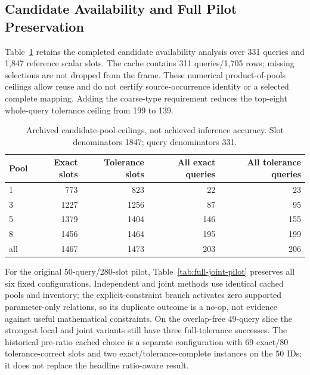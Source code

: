 \subsection{Candidate Availability and Full Pilot Preservation}
Table~\ref{tab:cached-ceilings} retains the completed candidate availability analysis over 331 queries and 1,847 reference scalar slots. The cache contains 311 queries/1,705 rows; missing selections are not dropped from the frame. These numerical product-of-pools ceilings allow reuse and do not certify source-occurrence identity or a selected complete mapping. Adding the coarse-type requirement reduces the top-eight whole-query tolerance ceiling from 199 to 139.

\begin{table}[htbp]\centering\small
\caption{Archived candidate-pool ceilings, not achieved inference accuracy. Slot denominators 1847; query denominators 331.}\label{tab:cached-ceilings}
\begin{tabular}{@{}lrrrr@{}}\toprule
Pool & Exact slots & Tolerance slots & All exact queries & All tolerance queries\\\midrule
1 & 773 & 823 & 22 & 23\\
3 & 1227 & 1256 & 87 & 95\\
5 & 1379 & 1404 & 146 & 155\\
8 & 1456 & 1464 & 195 & 199\\
all & 1467 & 1473 & 203 & 206\\
\bottomrule\end{tabular}\end{table}

For the original 50-query/280-slot pilot, Table~\ref{tab:full-joint-pilot} preserves all six fixed configurations. Independent and joint methods use identical cached pools and inventory; the explicit-constraint branch activates zero supported parameter-only relations, so its duplicate outcome is a no-op, not evidence against useful mathematical constraints. On the overlap-free 49-query slice the strongest local and joint variants still have three full-tolerance successes. The historical pre-ratio cached choice is a separate configuration with 69 exact/80 tolerance-correct slots and two exact/tolerance-complete instances on the 50 IDs; it does not replace the headline ratio-aware result.

